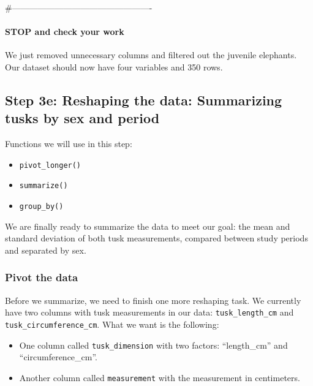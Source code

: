 \documentclass[
]{article}
\providecommand{\tightlist}{%
  \setlength{\itemsep}{0pt}\setlength{\parskip}{0pt}}
\begin{document}
\#-------------------------------------------------

\paragraph{\texorpdfstring{\textbf{STOP and check your
work}}{STOP and check your work}}\label{stop-and-check-your-work-3}

We just removed unnecessary columns and filtered out the juvenile
elephants. Our dataset should now have four variables and 350 rows.

\subsection{\texorpdfstring{Step 3e: \textbf{Reshaping the data:
Summarizing tusks by sex and
period}}{Step 3e: Reshaping the data: Summarizing tusks by sex and period}}\label{step-3e-reshaping-the-data-summarizing-tusks-by-sex-and-period}

Functions we will use in this step:

\begin{itemize}
\tightlist
\item
  \texttt{pivot\_longer()}
\item
  \texttt{summarize()}
\item
  \texttt{group\_by()}
\end{itemize}

We are finally ready to summarize the data to meet our goal: the mean
and standard deviation of both tusk measurements, compared between study
periods and separated by sex.

\subsubsection{Pivot the data}\label{pivot-the-data}

Before we summarize, we need to finish one more reshaping task. We
currently have two columns with tusk measurements in our data:
\texttt{tusk\_length\_cm} and \texttt{tusk\_circumference\_cm}. What we
want is the following:

\begin{itemize}
\tightlist
\item
  One column called \texttt{tusk\_dimension} with two factors:
  ``length\_cm'' and ``circumference\_cm''.
\item
  Another column called \texttt{measurement} with the measurement in
  centimeters.
\end{itemize}
\end{document}
